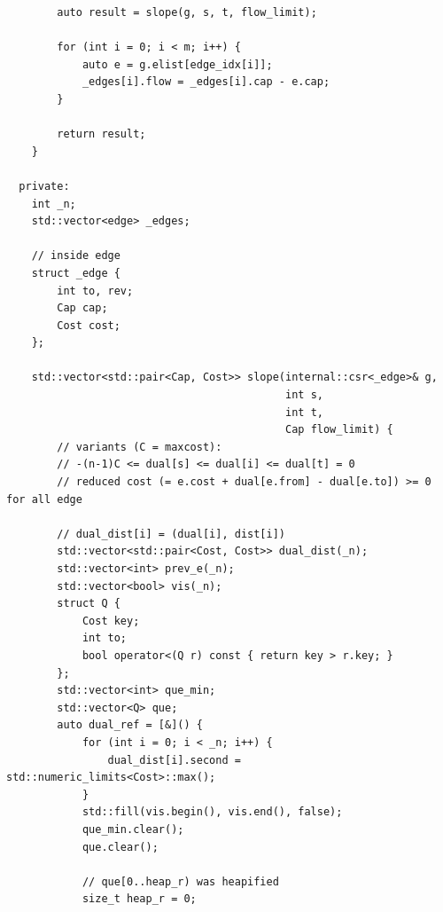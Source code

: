 \documentclass[UTF8]{article}
\begin{document}
\begin{verbatim}
        auto result = slope(g, s, t, flow_limit);

        for (int i = 0; i < m; i++) {
            auto e = g.elist[edge_idx[i]];
            _edges[i].flow = _edges[i].cap - e.cap;
        }

        return result;
    }

  private:
    int _n;
    std::vector<edge> _edges;

    // inside edge
    struct _edge {
        int to, rev;
        Cap cap;
        Cost cost;
    };

    std::vector<std::pair<Cap, Cost>> slope(internal::csr<_edge>& g,
                                            int s,
                                            int t,
                                            Cap flow_limit) {
        // variants (C = maxcost):
        // -(n-1)C <= dual[s] <= dual[i] <= dual[t] = 0
        // reduced cost (= e.cost + dual[e.from] - dual[e.to]) >= 0 for all edge

        // dual_dist[i] = (dual[i], dist[i])
        std::vector<std::pair<Cost, Cost>> dual_dist(_n);
        std::vector<int> prev_e(_n);
        std::vector<bool> vis(_n);
        struct Q {
            Cost key;
            int to;
            bool operator<(Q r) const { return key > r.key; }
        };
        std::vector<int> que_min;
        std::vector<Q> que;
        auto dual_ref = [&]() {
            for (int i = 0; i < _n; i++) {
                dual_dist[i].second = std::numeric_limits<Cost>::max();
            }
            std::fill(vis.begin(), vis.end(), false);
            que_min.clear();
            que.clear();

            // que[0..heap_r) was heapified
            size_t heap_r = 0;


\end{verbatim}
\end{document}

